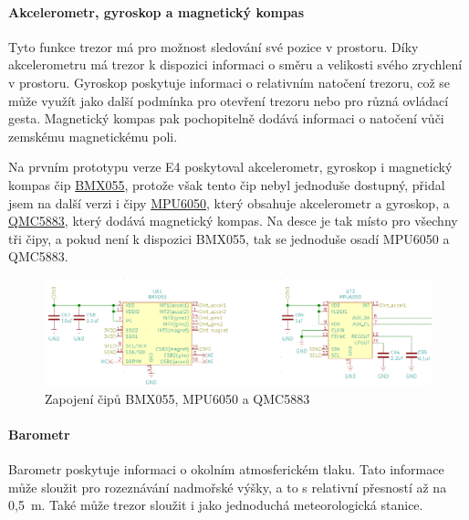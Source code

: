 \paragraph{Akcelerometr, gyroskop a magnetický kompas}
Tyto funkce trezor má pro možnost sledování své pozice v prostoru. 
Díky akcelerometru má trezor k dispozici informaci o směru a velikosti svého zrychlení v prostoru.
Gyroskop poskytuje informaci o relativním natočení trezoru, což se může využít jako další podmínka pro otevření trezoru nebo pro různá ovládací gesta.
Magnetický kompas pak pochopitelně dodává informaci o natočení vůči zemskému magnetickému poli.

Na prvním prototypu verze E4 poskytoval akcelerometr, gyroskop i magnetický kompas čip \href{https://datasheet.lcsc.com/szlcsc/Bosch-Sensortec-BMX055_C94022.pdf}{BMX055}, 
protože však tento čip nebyl jednoduše dostupný, přidal jsem na další verzi i čipy \href{https://datasheet.lcsc.com/szlcsc/TDK-InvenSense-MPU-6050_C24112.pdf}{MPU6050},
který obsahuje akcelerometr a gyroskop, a \href{https://datasheet.lcsc.com/szlcsc/QST-QMC5883L-TR_C192585.pdf}{QMC5883}, který dodává magnetický kompas.
Na desce je tak místo pro všechny tři čipy, a pokud není k dispozici BMX055, tak se jednoduše osadí MPU6050 a QMC5883. 

\begin{figure}[htbp]
    \centering
    \includegraphics[width=\textwidth]{kapitoly/obrazky/E4/vnimani/BMX-MPU.png}
    \caption{Zapojení čipů BMX055, MPU6050 a QMC5883}
    \label{fig:E4-9axis}
\end{figure}

\newpage

\paragraph{Barometr}
Barometr poskytuje informaci o okolním atmosferickém tlaku. Tato informace může sloužit pro rozeznávání nadmořské výšky, a to s relativní přesností až na 0,5~m. Také může trezor sloužit 
i jako jednoduchá meteorologická stanice.

